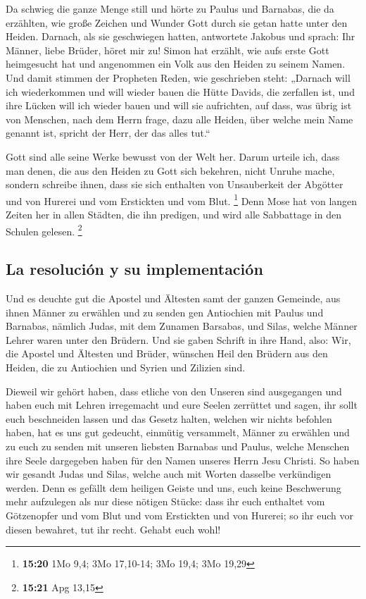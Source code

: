 Da schwieg die ganze Menge still und hörte zu Paulus und
Barnabas, die da erzählten, wie große Zeichen und Wunder Gott durch sie
getan hatte unter den Heiden.  Darnach, als sie
geschwiegen hatten, antwortete Jakobus und sprach: Ihr Männer, liebe
Brüder, höret mir zu!  Simon hat erzählt, wie aufs erste
Gott heimgesucht hat und angenommen ein Volk aus den Heiden zu seinem
Namen.  Und damit stimmen der Propheten Reden, wie
geschrieben steht:  „Darnach will ich wiederkommen und
will wieder bauen die Hütte Davids, die zerfallen ist, und ihre Lücken
will ich wieder bauen und will sie aufrichten,  auf dass,
was übrig ist von Menschen, nach dem Herrn frage, dazu alle Heiden, über
welche mein Name genannt ist, spricht der Herr, der das alles tut.``

 Gott sind alle seine Werke bewusst von der Welt her.
 Darum urteile ich, dass man denen, die aus den Heiden zu
Gott sich bekehren, nicht Unruhe mache,  sondern schreibe
ihnen, dass sie sich enthalten von Unsauberkeit der Abgötter und von
Hurerei und vom Erstickten und vom Blut. \footnote{\textbf{15:20} 1Mo
  9,4; 3Mo 17,10-14; 3Mo 19,4; 3Mo 19,29}  Denn Mose hat
von langen Zeiten her in allen Städten, die ihn predigen, und wird alle
Sabbattage in den Schulen gelesen. \footnote{\textbf{15:21} Apg 13,15}

\hypertarget{la-resoluciuxf3n-y-su-implementaciuxf3n}{%
\subsection{La resolución y su
implementación}\label{la-resoluciuxf3n-y-su-implementaciuxf3n}}

 Und es deuchte gut die Apostel und Ältesten samt der
ganzen Gemeinde, aus ihnen Männer zu erwählen und zu senden gen
Antiochien mit Paulus und Barnabas, nämlich Judas, mit dem Zunamen
Barsabas, und Silas, welche Männer Lehrer waren unter den Brüdern.
 Und sie gaben Schrift in ihre Hand, also: Wir, die
Apostel und Ältesten und Brüder, wünschen Heil den Brüdern aus den
Heiden, die zu Antiochien und Syrien und Zilizien sind.

 Dieweil wir gehört haben, dass etliche von den Unseren
sind ausgegangen und haben euch mit Lehren irregemacht und eure Seelen
zerrüttet und sagen, ihr sollt euch beschneiden lassen und das Gesetz
halten, welchen wir nichts befohlen haben,  hat es uns
gut gedeucht, einmütig versammelt, Männer zu erwählen und zu euch zu
senden mit unseren liebsten Barnabas und Paulus,  welche
Menschen ihre Seele dargegeben haben für den Namen unseres Herrn Jesu
Christi.  So haben wir gesandt Judas und Silas, welche
auch mit Worten dasselbe verkündigen werden.  Denn es
gefällt dem heiligen Geiste und uns, euch keine Beschwerung mehr
aufzulegen als nur diese nötigen Stücke:  dass ihr euch
enthaltet vom Götzenopfer und vom Blut und vom Erstickten und von
Hurerei; so ihr euch vor diesen bewahret, tut ihr recht. Gehabt euch
wohl!

